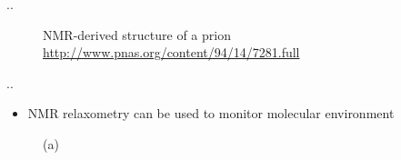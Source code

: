 \documentclass{beamer}
\begin{document}
\begin{frame}{\thesection.\thesubsection. \insertsubsection}
\begin{figure}[ht]
\begin{minipage}[t]{0.45\linewidth}
				\caption{NMR-derived structure of a prion  \url{http://www.pnas.org/content/94/14/7281.full}}
				\label{fig3}
			\end{minipage}					
		\end{figure}
	\end{frame}
	
	
	\begin{frame}{\thesection.\thesubsection. \insertsubsection}
		\begin{itemize}
			\item NMR relaxometry can be used to monitor molecular environment
		\end{itemize}

		\begin{figure}[ht]
					
						
			\begin{minipage}[t]{0.15\textwidth}
				\centering
				(a)

\end{minipage}
\end{figure}
\end{frame}
\end{document}
